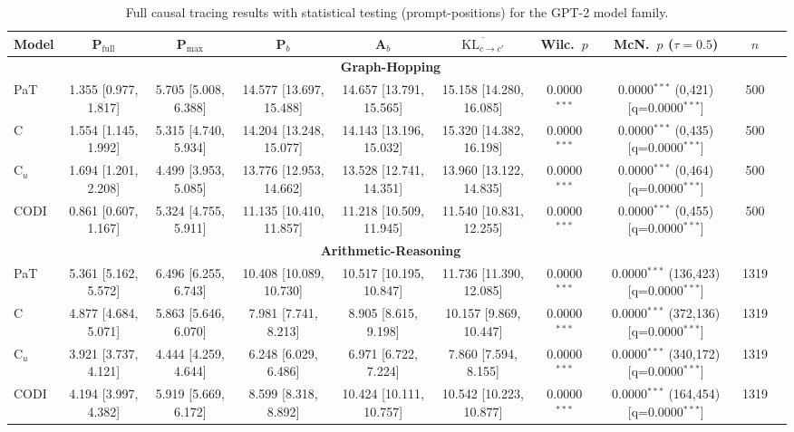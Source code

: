 \begin{table}[h!]
\centering
\tiny
\setlength{\tabcolsep}{2.5pt}
\begin{tabular}{l ccc c cc cc r}
\toprule
Model & P$_{\text{full}}$ & P$_{\max}$ & P$_b$ & A$_b$ & $\overline{\text{KL}_{c\to c'}}$ & Wilc.\ $p$ & McN.\ $p$ ($\tau{=}0.5$) & $n$ \\
\midrule
\multicolumn{9}{c}{\textbf{Graph-Hopping}} \\
\midrule
PaT & 1.355 [0.977, 1.817] & 5.705 [5.008, 6.388] & 14.577 [13.697, 15.488] & 14.657 [13.791, 15.565] & 15.158 [14.280, 16.085] & 0.0000$^{***}$ & 0.0000$^{***}$ (0,421) [q=0.0000$^{***}$] & 500 \\
C & 1.554 [1.145, 1.992] & 5.315 [4.740, 5.934] & 14.204 [13.248, 15.077] & 14.143 [13.196, 15.032] & 15.320 [14.382, 16.198] & 0.0000$^{***}$ & 0.0000$^{***}$ (0,435) [q=0.0000$^{***}$] & 500 \\
C$_u$ & 1.694 [1.201, 2.208] & 4.499 [3.953, 5.085] & 13.776 [12.953, 14.662] & 13.528 [12.741, 14.351] & 13.960 [13.122, 14.835] & 0.0000$^{***}$ & 0.0000$^{***}$ (0,464) [q=0.0000$^{***}$] & 500 \\
CODI & 0.861 [0.607, 1.167] & 5.324 [4.755, 5.911] & 11.135 [10.410, 11.857] & 11.218 [10.509, 11.945] & 11.540 [10.831, 12.255] & 0.0000$^{***}$ & 0.0000$^{***}$ (0,455) [q=0.0000$^{***}$] & 500 \\
\midrule
\multicolumn{9}{c}{\textbf{Arithmetic-Reasoning}} \\
\midrule
PaT & 5.361 [5.162, 5.572] & 6.496 [6.255, 6.743] & 10.408 [10.089, 10.730] & 10.517 [10.195, 10.847] & 11.736 [11.390, 12.085] & 0.0000$^{***}$ & 0.0000$^{***}$ (136,423) [q=0.0000$^{***}$] & 1319 \\
C & 4.877 [4.684, 5.071] & 5.863 [5.646, 6.070] & 7.981 [7.741, 8.213] & 8.905 [8.615, 9.198] & 10.157 [9.869, 10.447] & 0.0000$^{***}$ & 0.0000$^{***}$ (372,136) [q=0.0000$^{***}$] & 1319 \\
C$_u$ & 3.921 [3.737, 4.121] & 4.444 [4.259, 4.644] & 6.248 [6.029, 6.486] & 6.971 [6.722, 7.224] & 7.860 [7.594, 8.155] & 0.0000$^{***}$ & 0.0000$^{***}$ (340,172) [q=0.0000$^{***}$] & 1319 \\
CODI & 4.194 [3.997, 4.382] & 5.919 [5.669, 6.172] & 8.599 [8.318, 8.892] & 10.424 [10.111, 10.757] & 10.542 [10.223, 10.877] & 0.0000$^{***}$ & 0.0000$^{***}$ (164,454) [q=0.0000$^{***}$] & 1319 \\
\bottomrule
\end{tabular}
\caption{Full causal tracing results with statistical testing (prompt-positions) for the GPT-2 model family.}
\label{tab:causal_trace_prompt_gpt2}
\end{table}


